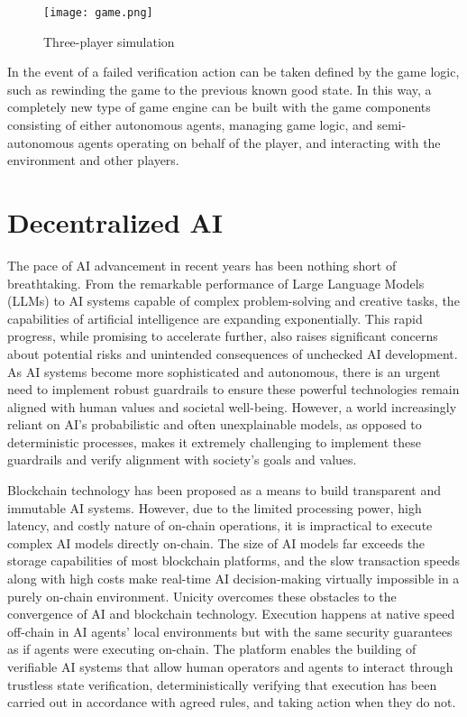 \documentclass{article}
\begin{document}
\begin{figure}[H]
    \centering
    \texttt{[image: game.png]}
    \caption{Three-player simulation}
    \label{fig:game}
\end{figure}

In the event of a failed verification action can be taken defined by the game logic, such as rewinding the game to the previous known good state. In this way, a completely new type of game engine can be built with the game components consisting of either autonomous agents, managing game logic, and semi-autonomous agents operating on behalf of the player, and interacting with the environment and other players.

\section{Decentralized AI}

The pace of AI advancement in recent years has been nothing short of breathtaking. From the remarkable performance of Large Language Models (LLMs) to AI systems capable of complex problem-solving and creative tasks, the capabilities of artificial intelligence are expanding exponentially. This rapid progress, while promising to accelerate further, also raises significant concerns about potential risks and unintended consequences of unchecked AI development. As AI systems become more sophisticated and autonomous, there is an urgent need to implement robust guardrails to ensure these powerful technologies remain aligned with human values and societal well-being. However, a world increasingly reliant on AI's probabilistic and often unexplainable models, as opposed to deterministic processes, makes it extremely challenging to implement these guardrails and verify alignment with society's goals and values.

Blockchain technology has been proposed as a means to build transparent and immutable AI systems. However, due to the limited processing power, high latency, and costly nature of on-chain operations, it is impractical to execute complex AI models directly on-chain. The size of AI models far exceeds the storage capabilities of most blockchain platforms, and the slow transaction speeds along with high costs make real-time AI decision-making virtually impossible in a purely on-chain environment. Unicity overcomes these obstacles to the convergence of AI and blockchain technology. Execution happens at native speed off-chain in AI agents' local environments but with the same security guarantees as if agents were executing on-chain. The platform enables the building of verifiable AI systems that allow human operators and agents to interact through trustless state verification, deterministically verifying that execution has been carried out in accordance with agreed rules, and taking action when they do not.
\end{document}
